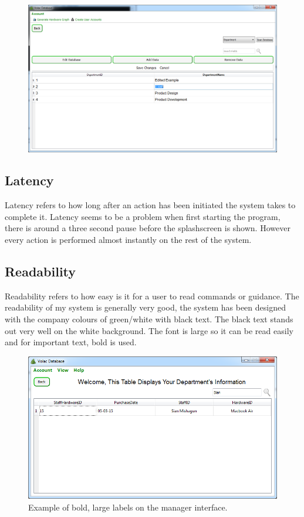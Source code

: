 \begin{figure}[H]
    \includegraphics[width=\textwidth]{./Evaluation/Images/admin2.png}
\end{figure}

\subsection{Latency}

Latency refers to how long after an action has been initiated the system takes to complete it. Latency seems to be a problem when first starting the program, there is around a three second pause before the splashscreen is shown. However every action is performed almost instantly on the rest of the system.

\subsection{Readability}

Readability refers to how easy is it for a user to read commands or guidance. The readability of my system is generally very good, the system has been designed with the company colours of green/white with black text. The black text stands out very well on the white background. The font is large so it can be read easily and for important text, bold is used.

\begin{figure}[H]
    \includegraphics[width=\textwidth]{./Evaluation/Images/managersearch.png}
    \caption{Example of bold, large labels on the manager interface.} 
\end{figure}

